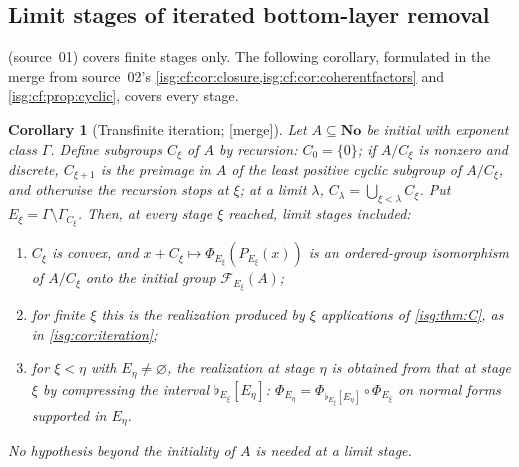 \documentclass[11pt]{article}
\newtheorem{corollary}[corollary]{Corollary}
\theoremstyle{definition}
\theoremstyle{remark}
\newcommand{\No}{\ensuremath{\mathbf{No}}}
\newcommand{\cmp}[1]{\flat_{#1}}
\begin{document}
\subsection{Limit stages of iterated bottom-layer removal}\label{isg:cf:sec:limit}
 (source~01) covers finite stages only. The
following corollary, formulated in the merge from source~02's
\cref{isg:cf:cor:closure,isg:cf:cor:coherentfactors} and
\cref{isg:cf:prop:cyclic}, covers every stage.

\begin{corollary}[Transfinite iteration; \textup{[merge]}]\label{isg:cf:cor:limit}
Let $A\subseteq\No$ be initial with exponent class $\Gamma$. Define
subgroups $C_\xi$ of $A$ by recursion: $C_0=\{0\}$; if $A/C_\xi$ is
nonzero and discrete, $C_{\xi+1}$ is the preimage in $A$ of the least
positive cyclic subgroup of $A/C_\xi$, and otherwise the recursion stops
at $\xi$; at a limit $\lambda$, $C_\lambda=\bigcup_{\xi<\lambda}C_\xi$.
Put $E_\xi=\Gamma\setminus\Gamma_{C_\xi}$. Then, at every stage $\xi$
reached, limit stages included:
\begin{enumerate}[label=\textup{(\roman*)}]
\item $C_\xi$ is convex, and $x+C_\xi\mapsto\Phi_{E_\xi}(P_{E_\xi}(x))$ is
      an ordered-group isomorphism of $A/C_\xi$ onto the initial group
      $\mathcal F_{E_\xi}(A)$;
\item for finite $\xi$ this is the realization produced by $\xi$
      applications of \cref{isg:thm:C}, as in \cref{isg:cor:iteration};
\item for $\xi<\eta$ with $E_\eta\ne\varnothing$, the realization at
      stage $\eta$ is obtained from that at stage $\xi$ by compressing
      the interval $\cmp{E_\xi}[E_\eta]$:
      $\Phi_{E_\eta}=\Phi_{\cmp{E_\xi}[E_\eta]}\circ\Phi_{E_\xi}$ on normal
      forms supported in $E_\eta$.
\end{enumerate}
No hypothesis beyond the initiality of $A$ is needed at a limit stage.
\end{corollary}
\end{document}

